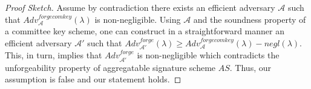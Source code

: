 \begin{proof}[Proof Sketch] Assume by contradiction there exists an efficient adversary $\mathcal{A}$ such that 
$\mathit{Adv}_{\mathcal{A}}^{\mathit{forgecomkey}}(\lambda)$ is non-negligible. Using $\mathcal{A}$ and the 
soundness property of a committee key scheme, one can construct in a straightforward manner an efficient 
adversary $\mathcal{A'}$ such that $ \mathit{Adv}_{\mathcal{A'}}^{\mathit{forge}}(\lambda) \geq \mathit{Adv}_{\mathcal{A}}^{\mathit{forgecomkey}}(\lambda)  - \mathit{negl}(\lambda).$ 
This, in turn, implies that $\mathit{Adv}_{\mathcal{A'}}^{\mathit{forge}}$ is non-negligible which contradicts the unforgeability property of aggregatable 
signature scheme $\mathit{AS}$. Thus, our assumption is false and our statement holds.
\end{proof}
\vspace{-0.15in}

